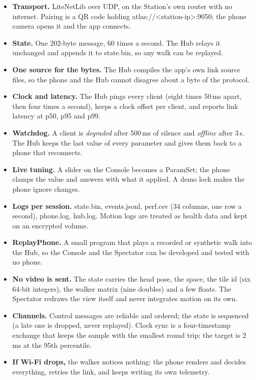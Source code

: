 \documentclass[10pt]{article}
\newcounter{sec}
\newcommand{\code}[1]{{\ttfamily\fontsize{8.8}{11}\selectfont #1}}
\begin{document}
\begin{itemize}
\item \textbf{Transport.} LiteNetLib over UDP, on the Station's own router with no internet. Pairing is a QR code holding \code{atlas://<station-ip>:9050}; the phone camera opens it and the app connects.
\item \textbf{State.} One 202-byte message, 60 times a second. The Hub relays it unchanged and appends it to \code{state.bin}, so any walk can be replayed.
\item \textbf{One source for the bytes.} The Hub compiles the app's own link source files, so the phone and the Hub cannot disagree about a byte of the protocol.
\item \textbf{Clock and latency.} The Hub pings every client (eight times 50\,ms apart, then four times a second), keeps a clock offset per client, and reports link latency at p50, p95 and p99.
\item \textbf{Watchdog.} A client is \emph{degraded} after 500\,ms of silence and \emph{offline} after 3\,s. The Hub keeps the last value of every parameter and gives them back to a phone that reconnects.
\item \textbf{Live tuning.} A slider on the Console becomes a \code{ParamSet}; the phone clamps the value and answers with what it applied. A demo lock makes the phone ignore changes.
\item \textbf{Logs per session.} \code{state.bin}, \code{events.jsonl}, \code{perf.csv} (34 columns, one row a second), \code{phone.log}, \code{hub.log}. Motion logs are treated as health data and kept on an encrypted volume.
\item \textbf{ReplayPhone.} A small program that plays a recorded or synthetic walk into the Hub, so the Console and the Spectator can be developed and tested with no phone.
\end{itemize}

\begin{itemize}
\item \textbf{No video is sent.} The state carries the head pose, the space, the tile id (six 64-bit integers), the walker matrix (nine doubles) and a few floats. The Spectator redraws the view itself and never integrates motion on its own.
\item \textbf{Channels.} Control messages are reliable and ordered; the state is sequenced (a late one is dropped, never replayed). Clock sync is a four-timestamp exchange that keeps the sample with the smallest round trip; the target is 2\,ms at the 95th percentile.
\item \textbf{If Wi-Fi drops,} the walker notices nothing: the phone renders and decides everything, retries the link, and keeps writing its own telemetry.
\end{itemize}
\end{document}
